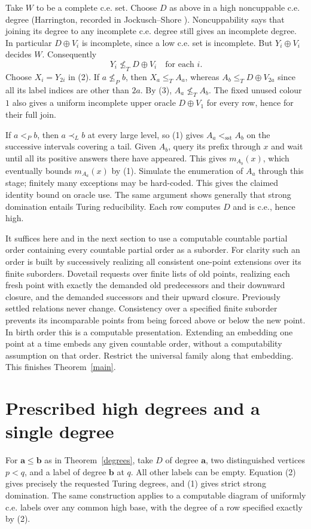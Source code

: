 \documentclass[11pt]{article}
\newcommand{\sst}{\mathrm{sst}}
\begin{document}
Take $W$ to be a complete c.e. set. Choose $D$ as above in a high noncuppable c.e. degree (Harrington, recorded in Jockusch--Shore \cite{js}). Noncuppability says that joining its degree to any incomplete c.e. degree still gives an incomplete degree. In particular $D\oplus V_i$ is incomplete, since a low c.e. set is incomplete. But $Y_i\oplus V_i$ decides $W$. Consequently
\[
                       Y_i\not\le_T D\oplus V_i\quad\text{for each }i.        \tag{3}
\]
Choose $X_i=Y_{2i}$ in (2). If $a\not\le_P b$, then $X_a\le_T A_a$, whereas $A_b\le_T D\oplus V_{2a}$ since all its label indices are other than $2a$. By (3), $A_a\not\le_T A_b$. The fixed unused colour $1$ also gives a uniform incomplete upper oracle $D\oplus V_1$ for every row, hence for their full join.

If $a<_P b$, then $a\prec_L b$ at every large level, so (1) gives $A_a<_{\sst}A_b$ on the successive intervals covering a tail. Given $A_b$, query its prefix through $x$ and wait until all its positive answers there have appeared. This gives $m_{A_b}(x)$, which eventually bounds $m_{A_a}(x)$ by (1). Simulate the enumeration of $A_a$ through this stage; finitely many exceptions may be hard-coded. This gives the claimed identity bound on oracle use. The same argument shows generally that strong domination entails Turing reducibility. Each row computes $D$ and is c.e., hence high.

It suffices here and in the next section to use a computable countable partial order containing every countable partial order as a suborder. For clarity such an order is built by successively realizing all consistent one-point extensions over its finite suborders. Dovetail requests over finite lists of old points, realizing each fresh point with exactly the demanded old predecessors and their downward closure, and the demanded successors and their upward closure. Previously settled relations never change. Consistency over a specified finite suborder prevents its incomparable points from being forced above or below the new point. In birth order this is a computable presentation. Extending an embedding one point at a time embeds any given countable order, without a computability assumption on that order. Restrict the universal family along that embedding. This finishes Theorem~\ref{main}.

\section{Prescribed high degrees and a single degree}
For $\mathbf a\le\mathbf b$ as in Theorem~\ref{degrees}, take $D$ of degree $\mathbf a$, two distinguished vertices $p<q$, and a label of degree $\mathbf b$ at $q$. All other labels can be empty. Equation (2) gives precisely the requested Turing degrees, and (1) gives strict strong domination. The same construction applies to a computable diagram of uniformly c.e. labels over any common high base, with the degree of a row specified exactly by (2).
\end{document}
